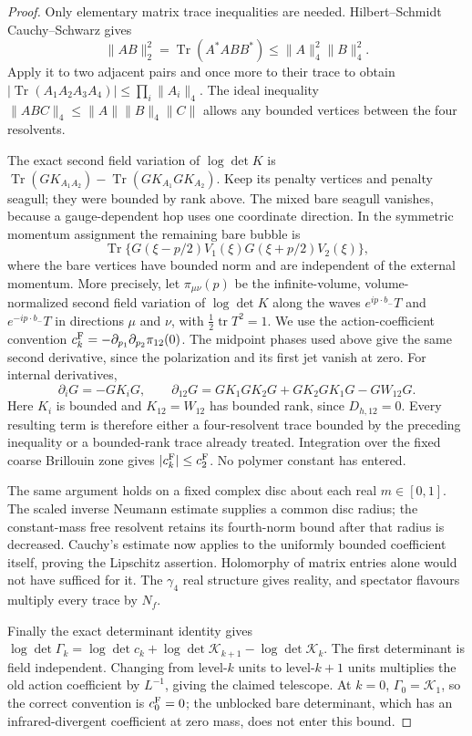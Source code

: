 \documentclass[11pt,letterpaper,reqno]{amsart}
\theoremstyle{definition}
\theoremstyle{remark}
\begin{document}
\begin{proof}
Only elementary matrix trace inequalities are
needed.  Hilbert--Schmidt Cauchy--Schwarz gives
\[
 \|AB\|_2^2=\operatorname{Tr}(A^*ABB^*)
          \le\|A\|_4^2\|B\|_4^2.
\]
Apply it to two adjacent pairs and once more
to their trace to obtain
$|\operatorname{Tr}(A_1A_2A_3A_4)|
\le\prod_i\|A_i\|_4$.  The ideal inequality
$\|ABC\|_4\le\|A\|\|B\|_4\|C\|$
allows any bounded vertices between the four
resolvents.

The exact second field variation of $\log\det K$
is $\operatorname{Tr}(GK_{A_1A_2})-
\operatorname{Tr}(GK_{A_1}GK_{A_2})$.
Keep its penalty vertices and penalty seagull;
they were bounded by rank above.  The mixed
bare seagull vanishes, because a gauge-dependent
hop uses one coordinate direction.  In the
symmetric momentum assignment the remaining
bare bubble is
\[
 \operatorname{Tr}\{G(\xi-p/2)V_1(\xi)
                           G(\xi+p/2)V_2(\xi)\},
\]
where the bare vertices have bounded norm and
are independent of the external momentum.
More precisely, let $\pi_{\mu\nu}(p)$ be the infinite-volume,
volume-normalized second field variation of $\log\det K$ along
the waves $e^{ip\cdot b_-}T$ and $e^{-ip\cdot b_-}T$ in
directions $\mu$ and $\nu$, with $\tfrac12\operatorname{tr}T^2=1$.
We use the action-coefficient convention
$c_k^{\rm F}=-\partial_{p_1}\partial_{p_2}\pi_{12}(0)$.
The midpoint phases used above give the same second derivative,
since the polarization and its first jet vanish at zero.
For internal derivatives,
\[
 \partial_iG=-GK_iG,\qquad
 \partial_{12}G=GK_1GK_2G+GK_2GK_1G-GW_{12}G.
\]
Here $K_i$ is bounded and $K_{12}=W_{12}$ has
bounded rank, since $D_{h,12}=0$.
Every resulting term is therefore either a
four-resolvent trace bounded by the preceding
inequality or a bounded-rank trace already
treated.  Integration over the fixed coarse
Brillouin zone gives $|c_k^{\rm F}|\le c_2^{\rm F}$.
No polymer constant has entered.

The same argument holds on a fixed complex
disc about each real $m\in[0,1]$.  The scaled
inverse Neumann estimate supplies a common
disc radius; the constant-mass free resolvent
retains its fourth-norm bound after that
radius is decreased.  Cauchy's estimate now
applies to the uniformly bounded coefficient
itself, proving the Lipschitz assertion.
Holomorphy of matrix entries alone would not
have sufficed for it.  The $\gamma_4$ real
structure gives reality, and spectator
flavours multiply every trace by $N_f$.

Finally the exact determinant identity gives
$\log\det\Gamma_k=\log\det c_k+
\log\det\mathcal K_{k+1}-\log\det\mathcal K_k$.
The first determinant is field independent.
Changing from level-$k$ units to level-$k+1$
units multiplies the old action coefficient
by $L^{-1}$, giving the claimed telescope.
At $k=0$, $\Gamma_0=\mathcal K_1$, so the
correct convention is $c_0^{\rm F}=0$;
the unblocked bare determinant, which has
an infrared-divergent coefficient at zero
mass, does not enter this bound.
\end{proof}
\end{document}
